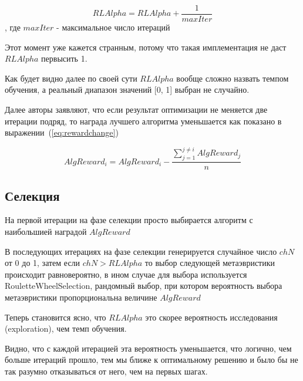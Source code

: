\documentclass[a4paper,12pt]{extarticle}
\begin{document}
\begin{equation}
	\label{eq:rlalpha}
		RLAlpha = RLAlpha + \frac{1}{maxIter}
\end{equation}, где $maxIter$ - максимальное число итераций

Этот момент уже кажется странным, потому что такая имплементация не даст $RLAlpha$ первысить 1. 

Как будет видно далее по своей сути $RLAlpha$ вообще сложно назвать темпом обучения, а реальный диапазон значений [0, 1] выбран не случайно.

Далее авторы заявляют, что если результат оптимизации не меняется две итерации подряд, то награда лучшего алгоритма уменьшается как показано в выражении~(\ref{eq:rewardchange})

\begin{equation}
	\label{eq:rewardchange}
		AlgReward_{i} = AlgReward_{i} - \frac{\sum_{j = 1}^{j \neq i} AlgReward_{j}}{n}
\end{equation}

\subsection{Селекция}

На первой итерации на фазе селекции просто выбирается алгоритм с наибольшией наградой $AlgReward$

В последующих итерациях на фазе селекции генерируется случайное число $chN$ от 0 до 1, затем если $chN > RLAlpha$ то выбор следующей метаэвристики происходит равновероятно, в ином случае для выбора используется RouletteWheelSelection, рандомный выбор, при котором вероятность выбора метаэвристики пропорциональна величине $AlgReward$

Теперь становится ясно, что $RLAlpha$ это скорее вероятность исследования (exploration), чем темп обучения. 

Видно, что с каждой итерацией эта вероятность уменьшается, что логично, чем больше итераций прошло, тем мы ближе к оптимальному решению и было бы не так разумно отказываться от него, чем на первых шагах.
\end{document}
